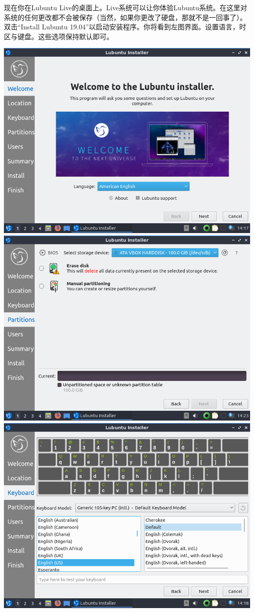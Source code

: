 现在你在Lubuntu Live的桌面上。Live系统可以让你体验Lubuntu系统。在这里对系统的任何更改都不会被保存（当然，如果你更改了硬盘，那就不是一回事了）。双击“Install Lubuntu 19.04”以启动安装程序。你将看到左图界面。设置语言，时区与键盘。这些选项保持默认即可。
\begin{center}
	\includegraphics[width=0.7\linewidth]{pic/lubinst3}	\includegraphics[width=0.7\linewidth]{pic/lubinst7}\\
	\includegraphics[width=0.7\linewidth]{pic/lubinst5}
\end{center} \par
